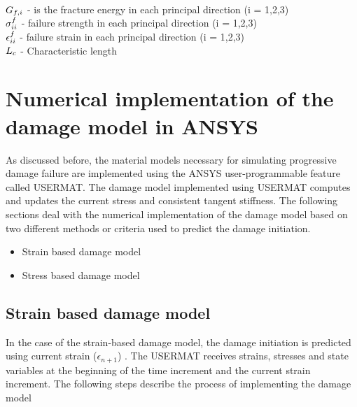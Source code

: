 \documentclass[12pt,a4paper,twoside,openright]{report}
\begin{document}
\\ 
\\ 
\\
$\mathlarger{G_{f,i}}$ \; - \;is the fracture energy in each principal direction (i = 1,2,3)  \\ $\mathlarger{\sigma_{ii}^{f}}$ \;\;\; -  \;  failure strength in each principal direction (i = 1,2,3) \\ $\mathlarger{\epsilon_{ii}^{f}}$\;\;\;\;\; - \; failure strain in each principal direction (i = 1,2,3) \\ $\mathlarger{L_{c}}$\;\;\;\;\; - \; Characteristic length

\section{Numerical implementation of the damage model in ANSYS}
\indent\indent\indent  As discussed before, the material models necessary for simulating progressive damage failure are implemented using the ANSYS user-programmable feature called USERMAT. The damage model implemented using USERMAT computes and updates the current stress and consistent tangent stiffness. The following sections deal with the numerical implementation of the damage model based on two different methods or criteria used to predict the damage initiation.
\\
\begin{itemize}
\item Strain based damage model 
\item Stress based damage model 
\end{itemize}
\subsection{Strain based damage model}
\indent\indent\indent  In the case of the strain-based damage model, the damage initiation is predicted using current strain ($\epsilon_{n+1}$) \citep{wang2009three}.   The USERMAT receives strains, stresses and state variables at the beginning of the time increment and the current strain increment. The following steps describe the process of implementing the damage model
\end{document}
